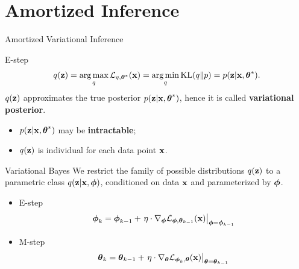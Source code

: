 \documentclass{beamer}
\begin{document}
\section{Amortized Inference}
\begin{frame}{Amortized Variational Inference}
	\begin{block}{E-step}
		\vspace{-0.3cm}
		\[
			q(\mathbf{z}) = \operatorname*{arg\,max}_q \mathcal{L}_{q, \boldsymbol{\theta}^*}(\mathbf{x}) = \operatorname*{arg\,min}_q \mathrm{KL}(q \| p) =
		p(\mathbf{z}| \mathbf{x}, \boldsymbol{\theta}^*).
		\]
		\eqpause
		$q(\mathbf{z})$ approximates the true posterior $p(\mathbf{z}| \mathbf{x}, \boldsymbol{\theta}^*)$, hence it is called \textbf{variational posterior}.				
		\eqpause
		\begin{itemize}
			\item {\color{violet}$p(\mathbf{z}| \mathbf{x}, \boldsymbol{\theta}^*)$ may be \textbf{intractable}};
			\item {\color{teal}$q(\mathbf{z})$ is individual for each data point $\mathbf{x}$}.
		\end{itemize}
	\end{block}
	\eqpause
	\begin{block}{Variational Bayes}
		We restrict the family of possible distributions $q(\mathbf{z})$ to a parametric class $q(\mathbf{z}|\mathbf{x}, \boldsymbol{\phi})$, {\color{teal}conditioned on data $\mathbf{x}$} and {\color{violet}parameterized by $\boldsymbol{\phi}$}.
		\eqpause
		\begin{itemize}
			\item E-step
			\[
				\boldsymbol{\phi}_k = \boldsymbol{\phi}_{k-1} + \left.\eta \cdot \nabla_{\boldsymbol{\phi}} \mathcal{L}_{\boldsymbol{\phi}, \boldsymbol{\theta}_{k-1}}(\mathbf{x})\right|_{\boldsymbol{\phi}=\boldsymbol{\phi}_{k-1}}
			\]
			\item M-step
			\[
				\boldsymbol{\theta}_k = \boldsymbol{\theta}_{k-1} + \left.\eta \cdot \nabla_{\boldsymbol{\theta}} \mathcal{L}_{\boldsymbol{\phi}_k, \boldsymbol{\theta}}(\mathbf{x})\right|_{\boldsymbol{\theta}=\boldsymbol{\theta}_{k-1}}
			\]
		\end{itemize}
	\end{block}
\end{frame}
\end{document}
